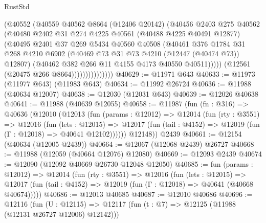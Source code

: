 \begin{lexlean}{RustStd}
\begin{coremodule}
                          (@40552
                            (@40559
                              @40562
                              @8664
                              (@12406 @20142)
                              (@40456
                                @2403
                                @275
                                @40562
                                (@40480
                                  @2402
                                  @31
                                  @274
                                  @4225
                                  @40561
                                  (@40488 @4225 @40491 @12877)
                                  (@40495
                                    @2401
                                    @37
                                    @269
                                    @5434
                                    @40560
                                    @40508
                                    (@40461
                                      @376
                                      @1784
                                      @31
                                      @268
                                      @4210
                                      @6902
                                      (@40469 @73 @31 @73 @4210 (@12447 (@40474 @73)) @12807)
                                      (@40462 @382 @266 @11 @4155 @4173 @40550 @40511)))))
                              (@12561 (@20475 @266 @8664)))))))))))))))
@40629 := @11971 @643
@40633 := @11973 (@11977 @643) (@11983 @643)
@40634 := @11992 @26724
@40636 := @11988 (@40634 @12007)
@40638 := @12030 (@12031 @643)
@40639 := @12026 @40638
@40641 := @11988 (@40639 @12055)
@40658 := @11987
    (fun (fn : @316) =>
    @40636
      (@12010
        (@12013
          (fun (params : @12012) =>
          @12014
            (fun (rty : @3551) =>
            @12016
              (fun (lets : @12015) =>
              @12017 (fun (tail : @4152) => @12019 (fun (Γ : @12018) => @40641 @12102))))))
        @12148))
    @2439
@40661 := @12154 (@40634 (@12005 @2439))
@40664 := @12067 (@12068 @2439) @26727
@40668 := @11988 (@12059 (@40664 @12076) @12080)
@40669 := @12093 @2439
@40674 := @12090 (@12092 @40669 @26730 @12048 @12050)
@40685 := fun (params : @12012) =>
  @12014
    (fun (rty : @3551) =>
    @12016
      (fun (lets : @12015) =>
      @12017 (fun (tail : @4152) => @12019 (fun (Γ : @12018) => @40641 (@40668 @40674)))))
@40686 := @12013 @40685
@40687 := @12010 @40686
@40696 := @12116
    (fun (U : @12115) => @12117 (fun (t : @7) => @12125 (@11988 (@12131 @26727 @12006) @12142)))

\end{coremodule}
\end{lexlean}
